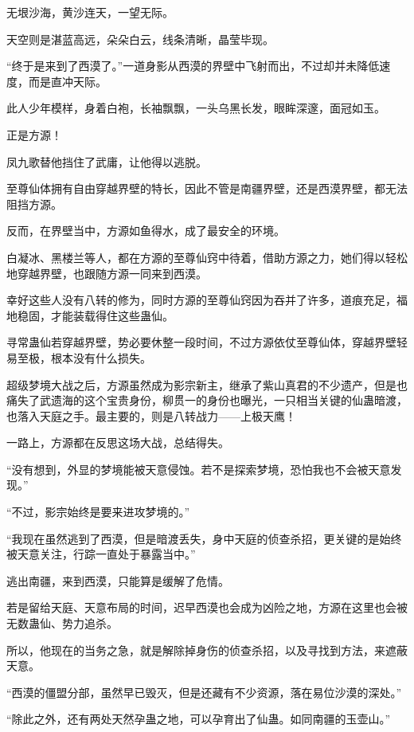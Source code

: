 
\begin{this_body}

无垠沙海，黄沙连天，一望无际。

天空则是湛蓝高远，朵朵白云，线条清晰，晶莹毕现。

“终于是来到了西漠了。”一道身影从西漠的界壁中飞射而出，不过却并未降低速度，而是直冲天际。

此人少年模样，身着白袍，长袖飘飘，一头乌黑长发，眼眸深邃，面冠如玉。

正是方源！

凤九歌替他挡住了武庸，让他得以逃脱。

至尊仙体拥有自由穿越界壁的特长，因此不管是南疆界壁，还是西漠界壁，都无法阻挡方源。

反而，在界壁当中，方源如鱼得水，成了最安全的环境。

白凝冰、黑楼兰等人，都在方源的至尊仙窍中待着，借助方源之力，她们得以轻松地穿越界壁，也跟随方源一同来到西漠。

幸好这些人没有八转的修为，同时方源的至尊仙窍因为吞并了许多，道痕充足，福地稳固，才能装载得住这些蛊仙。

寻常蛊仙若穿越界壁，势必要休整一段时间，不过方源依仗至尊仙体，穿越界壁轻易至极，根本没有什么损失。

超级梦境大战之后，方源虽然成为影宗新主，继承了紫山真君的不少遗产，但是也痛失了武遗海的这个宝贵身份，柳贯一的身份也曝光，一只相当关键的仙蛊暗渡，也落入天庭之手。最主要的，则是八转战力——上极天鹰！

一路上，方源都在反思这场大战，总结得失。

“没有想到，外显的梦境能被天意侵蚀。若不是探索梦境，恐怕我也不会被天意发现。”

“不过，影宗始终是要来进攻梦境的。”

“我现在虽然逃到了西漠，但是暗渡丢失，身中天庭的侦查杀招，更关键的是始终被天意关注，行踪一直处于暴露当中。”

逃出南疆，来到西漠，只能算是缓解了危情。

若是留给天庭、天意布局的时间，迟早西漠也会成为凶险之地，方源在这里也会被无数蛊仙、势力追杀。

所以，他现在的当务之急，就是解除掉身伤的侦查杀招，以及寻找到方法，来遮蔽天意。

“西漠的僵盟分部，虽然早已毁灭，但是还藏有不少资源，落在易位沙漠的深处。”

“除此之外，还有两处天然孕蛊之地，可以孕育出了仙蛊。如同南疆的玉壶山。”


\end{this_body}
